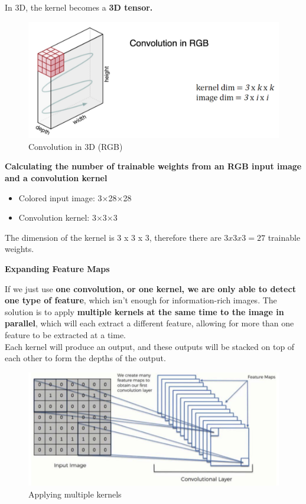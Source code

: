 In 3D, the kernel becomes a \textbf{3D tensor.}

\begin{figure}[h!t]
    \centering
    \includegraphics[width=0.5\linewidth]{conv3D.png}
    \caption{Convolution in 3D (RGB)}
    \label{fig:enter-label}
\end{figure}

\begin{example}
    \textbf{Calculating the number of trainable weights from an RGB input image and a convolution kernel}

    \begin{itemize}
        \item Colored input image: 3×28×28
        \item Convolution kernel: 3×3×3
    \end{itemize}

    The dimension of the kernel is 3 x 3 x 3, therefore there are \(3 x 3 x 3 = 27\) trainable weights.

\end{example}

\noindent\textbf{Expanding Feature Maps}

If we just use \textbf{one convolution, or one kernel, we are only able to detect one type of feature}, which isn't enough for information-rich images. The solution is to apply \textbf{multiple kernels at the same time to the image in parallel}, which will each extract a different feature, allowing for more than one feature to be extracted at a time. \\

\noindent Each kernel will produce an output, and these outputs will be stacked on top of each other to form the depths of the output.

\begin{figure}[h!t]
    \centering
    \includegraphics[width=0.5\linewidth]{expandingfeaturemaps.png}
    \caption{Applying multiple kernels}
    \label{fig:enter-label}
\end{figure}

